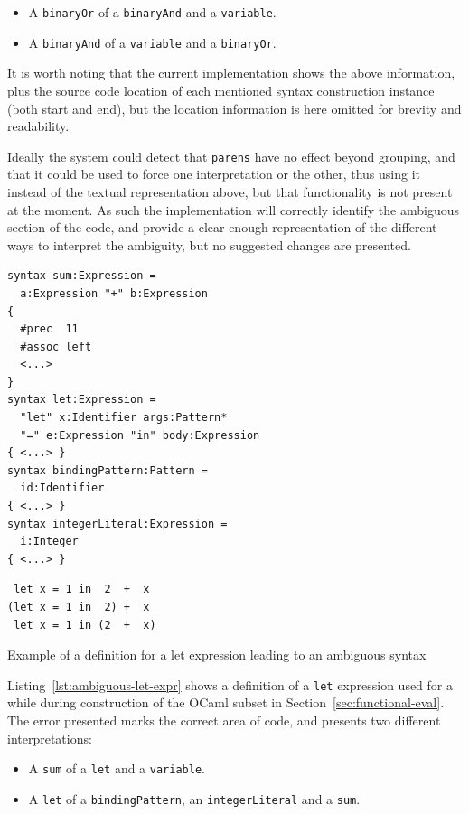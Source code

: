 \documentclass{kththesis}
\begin{document}
\begin{itemize}
  \item A \texttt{binaryOr} of a \texttt{binaryAnd} and a \texttt{variable}.
  \item A \texttt{binaryAnd} of a \texttt{variable} and a \texttt{binaryOr}.
\end{itemize}

It is worth noting that the current implementation shows the above information, plus the source code location of each mentioned syntax construction instance (both start and end), but the location information is here omitted for brevity and readability.

Ideally the system could detect that \texttt{parens} have no effect beyond grouping, and that it could be used to force one interpretation or the other, thus using it instead of the textual representation above, but that functionality is not present at the moment. As such the implementation will correctly identify the ambiguous section of the code, and provide a clear enough representation of the different ways to interpret the ambiguity, but no suggested changes are presented.

\begin{listing}[t]
\begin{verbatim}
syntax sum:Expression =
  a:Expression "+" b:Expression
{
  #prec  11
  #assoc left
  <...>
}
syntax let:Expression =
  "let" x:Identifier args:Pattern*
  "=" e:Expression "in" body:Expression
{ <...> }
syntax bindingPattern:Pattern =
  id:Identifier
{ <...> }
syntax integerLiteral:Expression =
  i:Integer
{ <...> }
\end{verbatim}
\begin{verbatim}
 let x = 1 in  2  +  x
(let x = 1 in  2) +  x
 let x = 1 in (2  +  x)
\end{verbatim}
\caption{Example of a definition for a let expression leading to an ambiguous syntax}
\label{lst:ambiguous-let-expr}
\end{listing}

Listing~\ref{lst:ambiguous-let-expr} shows a definition of a \texttt{let} expression used for a while during construction of the OCaml subset in Section~\ref{sec:functional-eval}. The error presented marks the correct area of code, and presents two different interpretations:

\begin{itemize}
  \item A \texttt{sum} of a \texttt{let} and a \texttt{variable}.
  \item A \texttt{let} of a \texttt{bindingPattern}, an \texttt{integerLiteral} and a \texttt{sum}.
\end{itemize}
\end{document}

